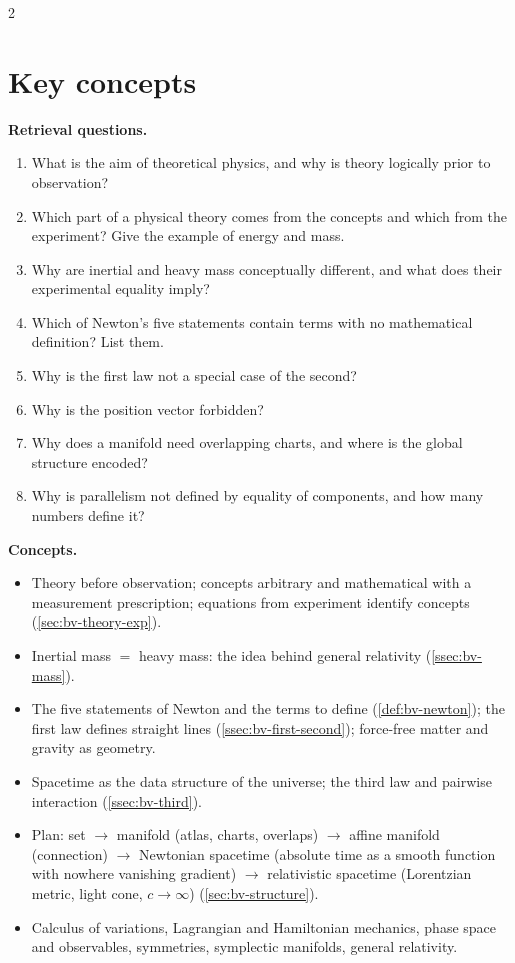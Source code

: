 \begin{paracol}{2}
\section*{Key concepts}
\begin{keyconcepts}
\textbf{Retrieval questions.}
\begin{enumerate}
  \item What is the aim of theoretical physics, and why is theory logically prior to observation?
  \item Which part of a physical theory comes from the concepts and which from the experiment? Give the example of
        energy and mass.
  \item Why are inertial and heavy mass conceptually different, and what does their experimental equality imply?
  \item Which of Newton's five statements contain terms with no mathematical definition? List them.
  \item Why is the first law not a special case of the second?
  \item Why is the position vector forbidden?
  \item Why does a manifold need overlapping charts, and where is the global structure encoded?
  \item Why is parallelism not defined by equality of components, and how many numbers define it?
\end{enumerate}
\textbf{Concepts.}
\begin{itemize}
  \item Theory before observation; concepts arbitrary and mathematical with a measurement prescription; equations from
        experiment identify concepts (\cref{sec:bv-theory-exp}).
  \item Inertial mass $=$ heavy mass: the idea behind general relativity (\cref{ssec:bv-mass}).
  \item The five statements of Newton and the terms to define (\cref{def:bv-newton}); the first law defines straight lines
        (\cref{ssec:bv-first-second}); force-free matter and gravity as geometry.
  \item Spacetime as the data structure of the universe; the third law and pairwise interaction (\cref{ssec:bv-third}).
  \item Plan: set $\to$ manifold (atlas, charts, overlaps) $\to$ affine manifold (connection) $\to$ Newtonian spacetime
        (absolute time as a smooth function with nowhere vanishing gradient) $\to$ relativistic spacetime (Lorentzian
        metric, light cone, $c\to\infty$) (\cref{sec:bv-structure}).
  \item Calculus of variations, Lagrangian and Hamiltonian mechanics, phase space and observables, symmetries,
        symplectic manifolds, general relativity.
\end{itemize}
\end{keyconcepts}

\flushside
\end{paracol}
